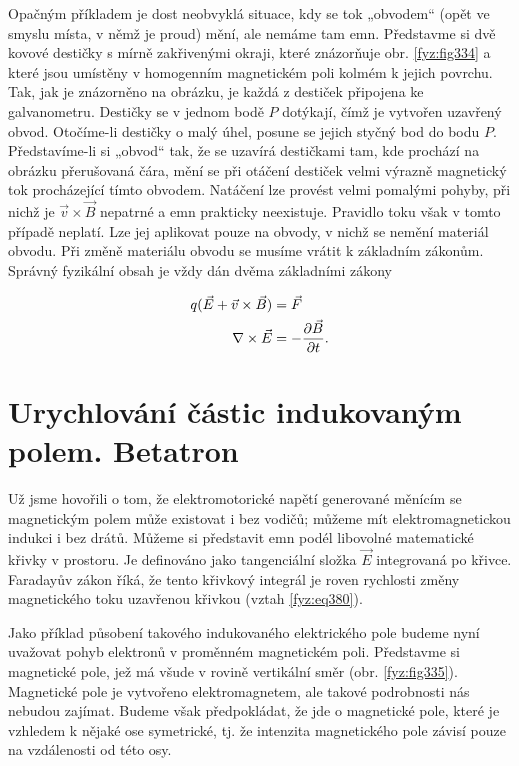   Opačným příkladem je dost neobvyklá situace, kdy se tok „obvodem“ (opět ve smyslu místa, v němž 
  je proud) mění, ale nemáme tam emn. Představme si dvě kovové destičky s mírně zakřivenými okraji, 
  které znázorňuje obr. \ref{fyz:fig334} a které jsou umístěny v homogenním magnetickém poli kolmém 
  k jejich povrchu. Tak, jak je znázorněno na obrázku, je každá z destiček připojena ke 
  galvanometru. Destičky se v jednom bodě \(P\) dotýkají, čímž je vytvořen uzavřený obvod. 
  Otočíme-li destičky o malý úhel, posune se jejich styčný bod do bodu \(P\). Představíme-li 
  si „obvod“ tak, že se uzavírá destičkami tam, kde prochází na obrázku přerušovaná čára, mění se 
  při otáčení destiček velmi výrazně magnetický tok procházející tímto obvodem. Natáčení lze 
  provést velmi pomalými pohyby, při nichž je \(\vec{v}\times\vec{B}\) nepatrné a emn prakticky 
  neexistuje. Pravidlo toku však v tomto případě neplatí. Lze jej aplikovat pouze na obvody, v 
  nichž se nemění materiál obvodu. Při změně materiálu obvodu se musíme vrátit k základním zákonům. 
  Správný fyzikální obsah je vždy dán dvěma základními zákony
  
  \begin{align*}
    q(\vec{E} + \vec{v}\times\vec{B}) &=  \vec{F}   \\
                  \nabla\times\vec{E} &= -\dfrac{\partial \vec{B}}{\partial t}.
  \end{align*}

\section{Urychlování částic indukovaným polem. Betatron}\label{fyz:IIchapXVIIsecIII}
  Už jsme hovořili o tom, že elektromotorické napětí generované měnícím se magnetickým polem může 
  existovat i bez vodičů; můžeme mít elektromagnetickou indukci i bez drátů. Můžeme si představit 
  emn podél libovolné matematické křivky v prostoru. Je definováno jako tangenciální složka 
  \(\vec{E}\) integrovaná po křivce. Faradayův zákon říká, že tento křivkový integrál je roven 
  rychlosti změny magnetického toku uzavřenou křivkou (vztah \ref{fyz:eq380}).
  
  Jako příklad působení takového indukovaného elektrického pole budeme nyní uvažovat pohyb 
  elektronů v proměnném magnetickém poli. Představme si magnetické pole, jež má všude v rovině 
  vertikální směr (obr. \ref{fyz:fig335}). Magnetické pole je vytvořeno elektromagnetem, ale takové 
  podrobnosti nás nebudou zajímat. Budeme však předpokládat, že jde o magnetické pole, které je 
  vzhledem k nějaké ose symetrické, tj. že intenzita magnetického pole závisí pouze na vzdálenosti 
  od této osy.

